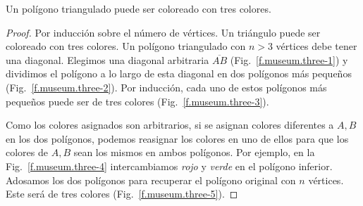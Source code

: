 \begin{theorem}
Un polígono triangulado puede ser coloreado con tres colores.\label{thm.colored}
\end{theorem}

\begin{proof}
Por inducción sobre el número de vértices. Un triángulo puede ser coloreado con tres colores. Un polígono triangulado con $n>3$ vértices debe tener una diagonal. Elegimos una diagonal arbitraria $\overline{AB}$ (Fig.~\ref{f.museum.three-1}) y dividimos el polígono a lo largo de esta diagonal en dos polígonos más pequeños (Fig.~\ref{f.museum.three-2}). Por inducción, cada uno de estos polígonos más pequeños puede ser de tres colores (Fig.~\ref{f.museum.three-3}).

Como los colores asignados son arbitrarios, si se asignan colores diferentes a $A,B$ en los dos polígonos, podemos reasignar los colores en uno de ellos para que los colores de $A,B$ sean los mismos en ambos polígonos. Por ejemplo, en la Fig.~\ref{f.museum.three-4} intercambiamos \emph{rojo} y \emph{verde} en el polígono inferior.
Adosamos los dos polígonos para recuperar el polígono original con $ n $ vértices. Este será de tres colores (Fig.~\ref{f.museum.three-5}).
\end{proof}

